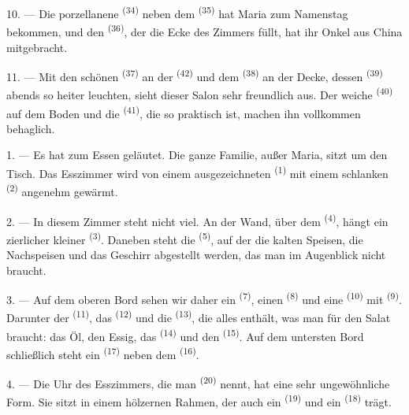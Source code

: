 10. --- Die porzellanene  \textsuperscript{(34)} neben dem
 \textsuperscript{(35)} hat Maria zum Namenstag bekommen, und den
 \textsuperscript{(36)}, der die Ecke des Zimmers füllt, hat ihr
Onkel aus China mitgebracht.

11. --- Mit den schönen  \textsuperscript{(37)} an der 
\textsuperscript{(42)} und dem  \textsuperscript{(38)} an der
Decke, dessen  \textsuperscript{(39)} abends so heiter
leuchten, sieht dieser Salon sehr freundlich aus. Der weiche 
\textsuperscript{(40)} auf dem Boden und die 
\textsuperscript{(41)}, die so praktisch ist, machen ihn vollkommen behaglich.

\VUsaut{3.6mm}
\VUsaut{3.0mm}

1. --- Es hat zum Essen geläutet. Die ganze Familie, außer Maria, sitzt um den
Tisch. Das Esszimmer wird von einem ausgezeichneten 
\textsuperscript{(1)} mit einem schlanken  \textsuperscript{(2)}
angenehm gewärmt.

2. --- In diesem Zimmer steht nicht viel. An der Wand, über dem 
\textsuperscript{(4)}, hängt ein zierlicher kleiner 
\textsuperscript{(3)}. Daneben steht die  \textsuperscript{(5)}, auf
der die kalten Speisen, die Nachspeisen und das Geschirr abgestellt werden, das man
im Augenblick nicht braucht.

3. --- Auf dem oberen Bord sehen wir daher ein 
\textsuperscript{(7)}, einen  \textsuperscript{(8)} und eine
 \textsuperscript{(10)} mit  \textsuperscript{(9)}.
Darunter der  \textsuperscript{(11)}, das 
\textsuperscript{(12)} und die  \textsuperscript{(13)}, die alles
enthält, was man für den Salat braucht: das Öl, den Essig, das 
\textsuperscript{(14)} und den  \textsuperscript{(15)}. Auf dem
untersten Bord schließlich steht ein  \textsuperscript{(17)} neben dem
 \textsuperscript{(16)}.

4. --- Die Uhr des Esszimmers, die man  \textsuperscript{(20)} nennt,
hat eine sehr ungewöhnliche Form. Sie sitzt in einem hölzernen Rahmen, der auch ein
 \textsuperscript{(19)} und ein 
\textsuperscript{(18)} trägt.

